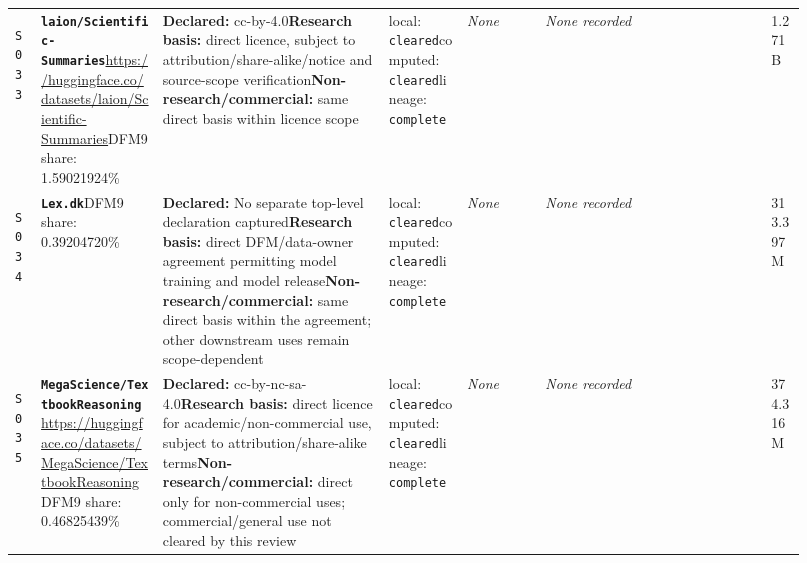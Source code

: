 \documentclass[9pt,a4paper]{article}
\newcommand{\srcid}[1]{\hypertarget{src:#1}{\texttt{#1}}}
\begin{document}
\begin{landscape}
\begin{longtable}{@{}L{0.03\linewidth}L{0.14\linewidth}L{0.26\linewidth}L{0.09\linewidth}L{0.09\linewidth}L{0.265\linewidth}L{0.045\linewidth}@{}}
\srcid{S033} & \textbf{\nolinkurl{laion/Scientific-Summaries}}\newline \url{https://huggingface.co/datasets/laion/Scientific-Summaries}\newline DFM9 share: 1.59021924\% & \textbf{Declared:} cc-by-4.0\newline \textbf{Research basis:} direct licence, subject to attribution/share-alike/notice and source-scope verification\newline \textbf{Non-research/commercial:} same direct basis within licence scope & local: \texttt{cleared}\newline computed: \texttt{cleared}\newline lineage: \texttt{complete} & \textit{None} & \textit{None recorded} & 1.271B \\
\srcid{S034} & \textbf{\nolinkurl{Lex.dk}}\newline \url{}\newline DFM9 share: 0.39204720\% & \textbf{Declared:} No separate top-level declaration captured\newline \textbf{Research basis:} direct DFM/data-owner agreement permitting model training and model release\newline \textbf{Non-research/commercial:} same direct basis within the agreement; other downstream uses remain scope-dependent & local: \texttt{cleared}\newline computed: \texttt{cleared}\newline lineage: \texttt{complete} & \textit{None} & \textit{None recorded} & 313.397M \\
\srcid{S035} & \textbf{\nolinkurl{MegaScience/TextbookReasoning}}\newline \url{https://huggingface.co/datasets/MegaScience/TextbookReasoning}\newline DFM9 share: 0.46825439\% & \textbf{Declared:} cc-by-nc-sa-4.0\newline \textbf{Research basis:} direct licence for academic/non-commercial use, subject to attribution/share-alike terms\newline \textbf{Non-research/commercial:} direct only for non-commercial uses; commercial/general use not cleared by this review & local: \texttt{cleared}\newline computed: \texttt{cleared}\newline lineage: \texttt{complete} & \textit{None} & \textit{None recorded} & 374.316M \\

\end{longtable}
\end{landscape}
\end{document}
